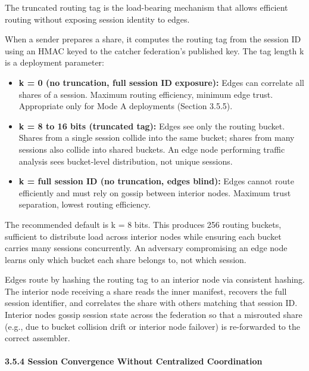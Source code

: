 \documentclass[
  11pt,
]{article}
\providecommand{\tightlist}{%
  \setlength{\itemsep}{0pt}\setlength{\parskip}{0pt}}
\begin{document}
The truncated routing tag is the load-bearing mechanism that allows
efficient routing without exposing session identity to edges.

When a sender prepares a share, it computes the routing tag from the
session ID using an HMAC keyed to the catcher federation's published
key. The tag length k is a deployment parameter:

\begin{itemize}
\tightlist
\item
  \textbf{k = 0 (no truncation, full session ID exposure):} Edges can
  correlate all shares of a session. Maximum routing efficiency, minimum
  edge trust. Appropriate only for Mode A deployments (Section 3.5.5).
\item
  \textbf{k = 8 to 16 bits (truncated tag):} Edges see only the routing
  bucket. Shares from a single session collide into the same bucket;
  shares from many sessions also collide into shared buckets. An edge
  node performing traffic analysis sees bucket-level distribution, not
  unique sessions.
\item
  \textbf{k = full session ID (no truncation, edges blind):} Edges
  cannot route efficiently and must rely on gossip between interior
  nodes. Maximum trust separation, lowest routing efficiency.
\end{itemize}

The recommended default is k = 8 bits. This produces 256 routing
buckets, sufficient to distribute load across interior nodes while
ensuring each bucket carries many sessions concurrently. An adversary
compromising an edge node learns only which bucket each share belongs
to, not which session.

Edges route by hashing the routing tag to an interior node via
consistent hashing. The interior node receiving a share reads the inner
manifest, recovers the full session identifier, and correlates the share
with others matching that session ID. Interior nodes gossip session
state across the federation so that a misrouted share (e.g., due to
bucket collision drift or interior node failover) is re-forwarded to the
correct assembler.

\hypertarget{session-convergence-without-centralized-coordination}{%
\paragraph{3.5.4 Session Convergence Without Centralized
Coordination}\label{session-convergence-without-centralized-coordination}}
\end{document}
